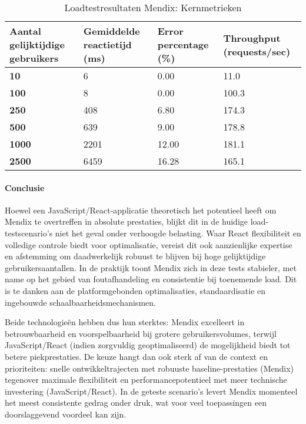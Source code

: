 \begin{table}[h]
    \centering
    \begin{tabular}{ |p{5cm}|p{3cm}|p{3cm}|p{3cm}|}
        \hline
        \textbf{Aantal gelijktijdige \newline gebruikers} & \textbf{Gemiddelde reactietijd (ms)} & \textbf{Error \newline percentage (\%)} & \textbf{Throughput (requests/sec)}\\
        \hline
        \textbf{10}  & 6 & 0.00 & 11.0 \\
        \hline
        \textbf{100} & 8 & 0.00 & 100.3 \\
        \hline
        \textbf{250}  & 408 & 6.80 & 174.3 \\
        \hline
        \textbf{500}  & 639 & 9.00 & 178.8 \\
        \hline                       
        \textbf{1000}  & 2201 & 12.00 & 181.1  \\
        \hline
        \textbf{2500}  & 6459 & 16.28 & 165.1 \\
        \hline
    \end{tabular}
    \caption[\centering Loadtestresultaten Mendix: Kernmetrieken]{\label{tab:Testresultaten Mendix loadtest}Loadtestresultaten Mendix: Kernmetrieken}
\end{table}



\paragraph{Conclusie}
Hoewel een JavaScript/React-applicatie theoretisch het potentieel heeft om Mendix te overtreffen in absolute prestaties, blijkt dit in de huidige load-testscenario’s niet het geval onder verhoogde belasting. Waar React flexibiliteit en volledige controle biedt voor optimalisatie, vereist dit ook aanzienlijke expertise en afstemming om daadwerkelijk robuust te blijven bij hoge gelijktijdige gebruikersaantallen. In de praktijk toont Mendix zich in deze tests stabieler, met name op het gebied van foutafhandeling en consistentie bij toenemende load. Dit is te danken aan de platformgebonden optimalisaties, standaardisatie en ingebouwde schaalbaarheidsmechanismen.

Beide technologieën hebben dus hun sterktes: Mendix excelleert in betrouwbaarheid en voorspelbaarheid bij grotere gebruikersvolumes, terwijl JavaScript/React (indien zorgvuldig geoptimaliseerd) de mogelijkheid biedt tot betere piekprestaties. De keuze hangt dan ook sterk af van de context en prioriteiten: snelle ontwikkeltrajecten met robuuste baseline-prestaties (Mendix) tegenover maximale flexibiliteit en performancepotentieel met meer technische investering (JavaScript/React). In de geteste scenario’s levert Mendix momenteel het meest consistente gedrag onder druk, wat voor veel toepassingen een doorslaggevend voordeel kan zijn.



